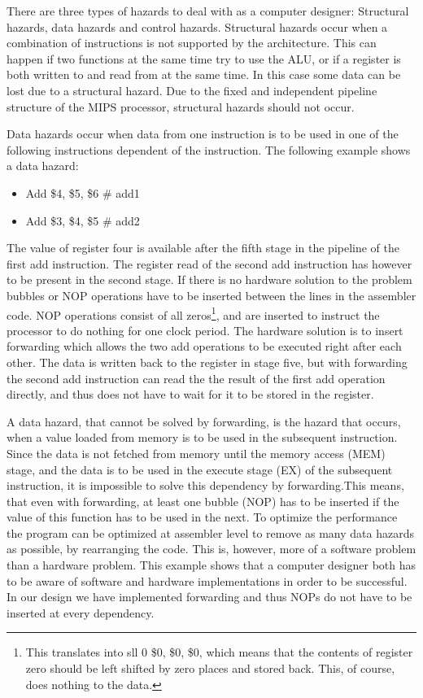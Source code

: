 There are three types of hazards to deal with as a computer designer: Structural hazards, data hazards and control hazards. Structural hazards occur when a combination of instructions is not supported by the architecture. This can happen if two functions at the same time try to use the ALU, or if a register is both written to and read from at the same time. In this case some data can be lost due to a structural hazard. Due to the fixed and independent pipeline structure of the MIPS processor, structural hazards should not occur. %

Data hazards occur when data from one instruction is to be used in one of the following instructions dependent of the instruction. The following example shows a data hazard:

\begin{itemize}
\item[] Add \$4, \$5, \$6 \# add1
\item[] Add \$3, \$4, \$5 \# add2
\end{itemize}

The value of register four is available after the fifth stage in the pipeline of the first add instruction. The register read of the second add instruction has however to be present in the second stage. If there is no hardware solution to the problem bubbles or NOP operations have to be inserted between the lines in the assembler code. NOP operations consist of all zeros\footnote{This translates into sll 0 \$0, \$0, \$0, which means that the contents of register zero should be left shifted by zero places and stored back. This, of course, does nothing to the data.}, and are inserted to instruct the processor to do nothing for one clock period. The hardware solution is to insert forwarding which allows the two add operations to be executed right after each other. The data is written back to the register in stage five, but with forwarding the second add instruction can read the the result of the first add operation directly, and thus does not have to wait for it to be stored in the register.

A data hazard, that cannot be solved by forwarding, is the hazard that occurs, when a value loaded from memory is to be used in the subsequent instruction. Since the data is not fetched from memory until the memory access (MEM) stage, and the data is to be used in the execute stage (EX) of the subsequent instruction, it is impossible to solve this dependency by forwarding.This means, that even with forwarding, at least one bubble (NOP) has to be inserted if the value of this function has to be used in the next. To optimize the performance the program can be optimized at assembler level to remove as many data hazards as possible, by rearranging the code. This is, however, more of a software problem than a hardware problem. This example shows that a computer designer both has to be aware of software and hardware implementations in order to be successful. In our design we have implemented forwarding and thus NOPs do not have to be inserted at every dependency. 

